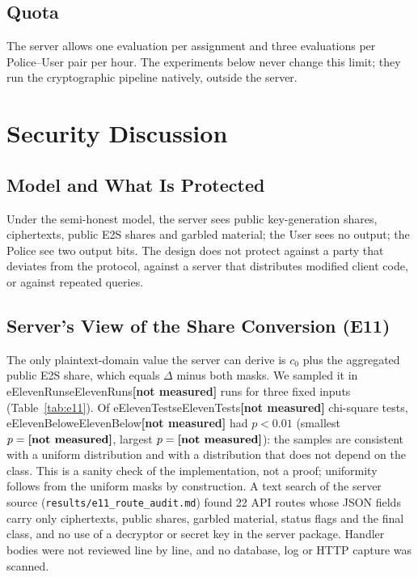 \documentclass[conference,letterpaper]{IEEEtran}
\newcommand{\num}[1]{\ifcsname #1\endcsname\csname #1\endcsname\else\textbf{[not measured]}\fi}
\newcommand{\tabin}[1]{\IfFileExists{generated/#1}{\resizebox{\ifdim\width>\columnwidth\columnwidth\else\width\fi}{!}{}}{\textbf{[not measured]}}}
\begin{document}
\subsection{Quota}
The server allows one evaluation per assignment and three evaluations per Police--User pair per hour. The experiments below never change this limit; they run the cryptographic pipeline natively, outside the server.

\section{Security Discussion}
\subsection{Model and What Is Protected}
Under the semi-honest model, the server sees public key-generation shares, ciphertexts, public E2S shares and garbled material; the User sees no output; the Police see two output bits. The design does not protect against a party that deviates from the protocol, against a server that distributes modified client code, or against repeated queries.

\subsection{Server's View of the Share Conversion (E11)}
The only plaintext-domain value the server can derive is $c_0$ plus the aggregated public E2S share, which equals $\Delta$ minus both masks. We sampled it in \num{eElevenRuns} runs for three fixed inputs (Table~\ref{tab:e11}). Of \num{eElevenTests} chi-square tests, \num{eElevenBelow} had $p < 0.01$ (smallest $p = \num{eElevenMinP}$, largest $p = \num{eElevenMaxP}$): the samples are consistent with a uniform distribution and with a distribution that does not depend on the class. This is a sanity check of the implementation, not a proof; uniformity follows from the uniform masks by construction. A text search of the server source (\texttt{results/e11\_route\_audit.md}) found 22 API routes whose JSON fields carry only ciphertexts, public shares, garbled material, status flags and the final class, and no use of a decryptor or secret key in the server package. Handler bodies were not reviewed line by line, and no database, log or HTTP capture was scanned.

\begin{table}[t]
\caption{Chi-square tests on the server's view of E2S ($p$ from the Wilson--Hilferty approximation).}
\label{tab:e11}
\centering\scriptsize
\tabin{tab_e11.tex}
\end{table}
\end{document}
